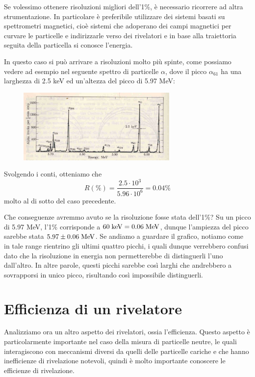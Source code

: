 \begin{esempio}
   Se volessimo ottenere risoluzioni migliori dell'1\%, è necessario ricorrere ad altra strumentazione. In particolare è preferibile utilizzare dei sistemi basati su spettrometri magnetici, cioè sistemi che adoperano dei campi magnetici per curvare le particelle e indirizzarle verso dei rivelatori e in base alla traiettoria seguita della particella si conosce l'energia. 

   In questo caso si può arrivare a risoluzioni molto più spinte, come possiamo vedere ad esempio nel seguente spettro di particelle $\alpha$, dove il picco $\alpha_{61}$ ha una larghezza di 2.5 keV ed un'altezza del picco di 5.97 MeV:
   \begin{figure}[H]
      \centering
      \includegraphics[width=0.7\textwidth]{immagini/spettro_alpha_riv_spettrometro.png}
   \end{figure}
   Svolgendo i conti, otteniamo che
   \begin{equation*}
      R(\%)=\frac{2.5 \cdot 10^3}{5.96 \cdot 10^6}=0.04\%
   \end{equation*}
   molto al di sotto del caso precedente.

   Che conseguenze avremmo avuto se la risoluzione fosse stata dell'1\%? Su un picco di 5.97 MeV, l'1\% corrisponde a $\rm 60 \; keV=0.06 \; MeV$, dunque l'ampiezza del picco sarebbe stata $\rm 5.97 \pm 0.06 \; MeV$. Se andiamo a guardare il grafico, notiamo come in tale range rientrino gli ultimi quattro picchi, i quali dunque verrebbero confusi dato che la risoluzione in energia non permetterebbe di distinguerli l'uno dall'altro. In altre parole, questi picchi sarebbe così larghi che andrebbero a sovrapporsi in unico picco, risultando così impossibile distinguerli.
\end{esempio}
\section{Efficienza di un rivelatore}
Analizziamo ora un altro aspetto dei rivelatori, ossia l'efficienza. Questo aspetto è particolarmente importante nel caso della misura di particelle neutre, le quali interagiscono con meccanismi diversi da quelli delle particelle cariche e che hanno inefficienze di rivelazione notevoli, quindi è molto importante conoscere le efficienze di rivelazione.
